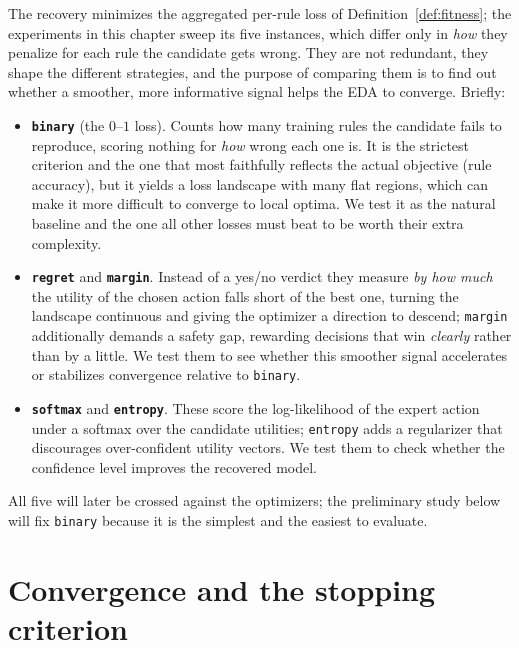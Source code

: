 The recovery minimizes the aggregated per-rule loss of
Definition~\ref{def:fitness}; the experiments in this chapter sweep its five
instances, which differ only in \emph{how} they penalize for each rule the candidate
gets wrong. They are not redundant, they shape the different strategies, and the purpose of comparing them is to find out whether a
smoother, more informative signal helps the EDA to converge. Briefly:

\begin{itemize}
  \item \textbf{\texttt{binary}} (the $0$--$1$ loss). Counts how many training
        rules the candidate fails to reproduce, scoring nothing for
        \emph{how} wrong each one is. It is the strictest criterion and the one that most faithfully reflects the actual objective (rule accuracy), but it yields a loss landscape with many flat regions, which can make it more difficult to converge to local optima. We test it as the natural baseline and the one all
        other losses must beat to be worth their extra complexity.
  \item \textbf{\texttt{regret}} and \textbf{\texttt{margin}}. Instead of a
        yes/no verdict they measure \emph{by how much} the utility of the
        chosen action falls short of the best one, turning the landscape
        continuous and giving the optimizer a direction to descend; \texttt{margin}
        additionally demands a safety gap, rewarding decisions that win
        \emph{clearly} rather than by a little. We test them to see whether this
        smoother signal accelerates or stabilizes
        convergence relative to \texttt{binary}.
  \item \textbf{\texttt{softmax}} and \textbf{\texttt{entropy}}. These score the
        log-likelihood of the expert action under a softmax over the candidate
        utilities; \texttt{entropy}
        adds a regularizer that discourages over-confident utility vectors. We
        test them to check whether the confidence level improves the recovered model.
\end{itemize}

All five will later be crossed against the optimizers; the preliminary study below will fix \texttt{binary} because it is the simplest and the easiest to evaluate.


\section{Convergence and the stopping criterion}
\label{sec:stopmode}

